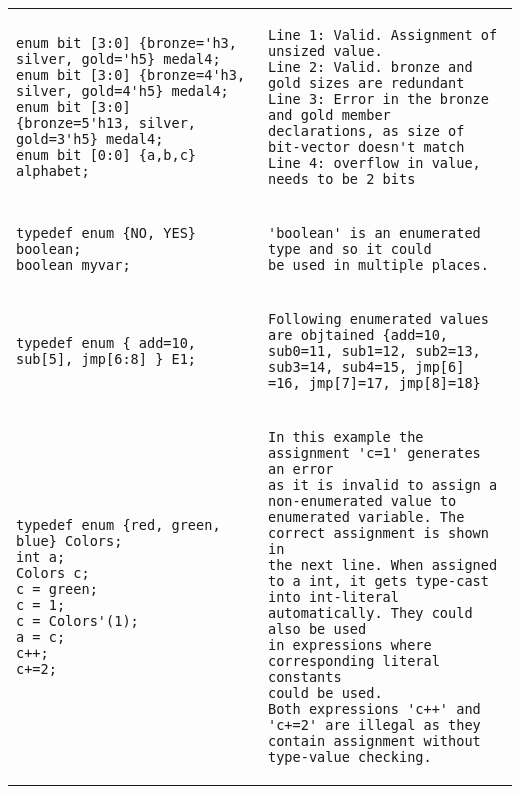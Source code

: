 \begin{table}
\begin{tabular}{p{} p{}}
\begin{Verbatim}
enum bit [3:0] {bronze='h3, silver, gold='h5} medal4;
enum bit [3:0] {bronze=4'h3, silver, gold=4'h5} medal4;
enum bit [3:0] {bronze=5'h13, silver, gold=3'h5} medal4;
enum bit [0:0] {a,b,c} alphabet;
\end{Verbatim}
&
\begin{tbldesc}
\begin{verbatim}
Line 1: Valid. Assignment of unsized value.
Line 2: Valid. bronze and gold sizes are redundant
Line 3: Error in the bronze and gold member
declarations, as size of bit-vector doesn't match
Line 4: overflow in value, needs to be 2 bits
\end{verbatim}
\end{tbldesc}
\\
\begin{Verbatim}
typedef enum {NO, YES} boolean;
boolean myvar;
\end{Verbatim}
&
\begin{tbldesc}
\begin{verbatim}
'boolean' is an enumerated type and so it could
be used in multiple places.
\end{verbatim}
\end{tbldesc}
\\
\begin{Verbatim}
typedef enum { add=10, sub[5], jmp[6:8] } E1;
\end{Verbatim}
&
\begin{tbldesc}
\begin{verbatim}
Following enumerated values are objtained {add=10,
sub0=11, sub1=12, sub2=13, sub3=14, sub4=15, jmp[6]
=16, jmp[7]=17, jmp[8]=18}
\end{verbatim}
\end{tbldesc}
\\
\begin{Verbatim}
typedef enum {red, green, blue} Colors;
int a;
Colors c;
c = green;
c = 1;
c = Colors'(1);
a = c;
c++;
c+=2;
\end{Verbatim}
&
\begin{tbldesc}
\begin{verbatim}
In this example the assignment 'c=1' generates an error
as it is invalid to assign a non-enumerated value to
enumerated variable. The correct assignment is shown in
the next line. When assigned to a int, it gets type-cast
into int-literal automatically. They could also be used
in expressions where corresponding literal constants
could be used.
Both expressions 'c++' and 'c+=2' are illegal as they
contain assignment without type-value checking.
\end{verbatim}
\end{tbldesc}


\end{tabular}
\end{table}
